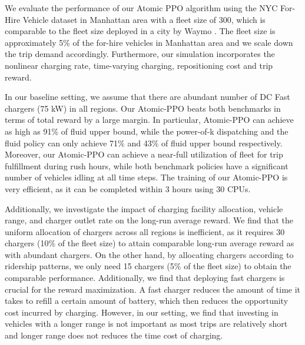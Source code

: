 We evaluate the performance of our Atomic PPO algorithm using the NYC For-Hire Vehicle dataset \citep{nyctlc} in Manhattan area with a fleet size of 300, which is comparable to the fleet size deployed in a city by Waymo \citep{waymo_news}.%
The fleet size is approximately 5\% of the for-hire vehicles in Manhattan area and we scale down the trip demand accordingly. Furthermore, our simulation incorporates the nonlinear charging rate, time-varying charging, repositioning cost and trip reward. 

In our baseline setting, we assume that there are abundant number of DC Fast chargers (75 kW) in all regions. Our Atomic-PPO beats both benchmarks in terms of total reward by a large margin. In particular, Atomic-PPO can achieve as high as 91\% of fluid upper bound, while the power-of-k dispatching and the fluid policy can only achieve 71\% and 43\% of fluid upper bound respectively. Moreover, our Atomic-PPO can achieve a near-full utilization of fleet for trip fulfillment during rush hours, while both benchmark policies have a significant number of vehicles idling at all time steps. The training of our Atomic-PPO is very efficient, as it can be completed within 3 hours using 30 CPUs. 

Additionally, we investigate the impact of charging facility allocation, vehicle range, and charger outlet rate on the long-run average reward. We find that the uniform allocation of chargers across all regions is inefficient, as it requires 30 chargers (10\% of the fleet size) to attain comparable long-run average reward as with abundant chargers. On the other hand, by allocating chargers according to ridership patterns, we only need 15 chargers (5\% of the fleet size) to obtain the comparable performance. Additionally, we find that deploying fast chargers is crucial for the reward maximization. A fast charger reduces the amount of time it takes to refill a certain amount of battery, which then reduces the opportunity cost incurred by charging. However, in our setting, we find that investing in vehicles with a longer range is not important as most trips are relatively short and longer range does not reduces the time cost of charging.%

